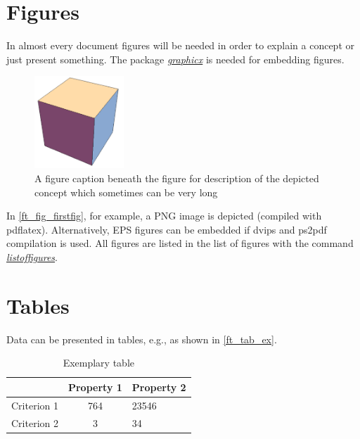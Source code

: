 \documentclass[a4paper,11pt,oneside]{book}
\newcommand{\imp}[1]{\underline{\textit{#1}}}
\begin{document}

\section{Figures}

In almost every document figures will be needed in order to explain a concept or just present something. The package \imp{graphicx} is needed for embedding figures.

\begin{figure}[!h]
	\centering
	\includegraphics[width=0.3\textwidth]{figures/cube}
	\caption{A figure caption beneath the figure for description of the depicted concept which sometimes can be very long}
	\label{ft_fig_firstfig}
\end{figure}

In \autoref{ft_fig_firstfig}, for example, a PNG image is depicted (compiled with pdflatex). Alternatively, EPS figures can be embedded if dvips and ps2pdf compilation is used. All figures are listed in the list of figures with the command \imp{listoffigures}.


\section{Tables}

Data can be presented in tables, e.g., as shown in \autoref{ft_tab_ex}.

\begin{table}[!h]
	\centering
	\begin{tabular}{l|cl}
		\hline \hline
		
		& Property 1
		& Property 2\\ \hline
		Criterion 1
		& 764
		& 23546 \\
		Criterion 2
		& 3
		& 34 \\
		\hline \hline
	\end{tabular}
	\caption{Exemplary table}
	\label{ft_tab_ex}
\end{table}
\end{document}
